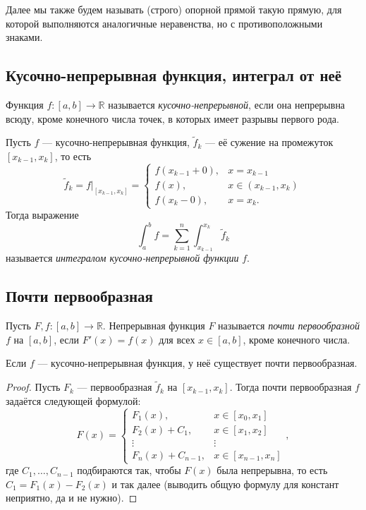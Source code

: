 \begin{remark}
	Далее мы также будем называть (строго) опорной прямой такую прямую, для которой выполняются аналогичные неравенства, но с противоположными знаками.
\end{remark}

\subsection{Кусочно-непрерывная функция, интеграл от неё}

\begin{ndefinition}
	Функция \(f \colon [a, b] \to \mathbb{R}\) называется \textit{кусочно-непрерывной}, если она непрерывна всюду, кроме конечного числа точек, в которых имеет разрывы первого рода.
\end{ndefinition}

\begin{ndefinition}
	Пусть \(f\) --- кусочно-непрерывная функция, \(\widetilde{f}_k\) --- её сужение на промежуток \([x_{k - 1}, x_k]\), то есть \[
	\widetilde{f}_k = f \big|_{[x_{k - 1}, x_k]} =
	\begin{cases}
		f(x_{k - 1} + 0), & x = x_{k - 1} 		   \\
		f(x),			  & x \in (x_{k - 1}, x_k) \\
		f(x_k - 0),		  & x = x_k.
	\end{cases}
	\]
	Тогда выражение \[
	\int_a^b f = \sum_{k = 1}^n \int_{x_{k - 1}}^{x_k} \widetilde{f}_k
	\]
	называется \textit{интегралом кусочно-непрерывной функции} \(f\).
\end{ndefinition}

\subsection{Почти первообразная}

\begin{definition}
	Пусть \(F, f \colon [a, b] \to \mathbb{R}\). Непрерывная функция \(F\) называется \textit{почти первообразной} \(f\) на \([a, b]\), если \(F'(x) = f(x)\) для всех \(x \in [a, b]\), кроме конечного числа.
\end{definition}

\begin{nremark}
	Если \(f\) --- кусочно-непрерывная функция, у неё существует почти первообразная.
\end{nremark}
\begin{proof}
	Пусть \(F_k\) --- первообразная \(\widetilde{f}_k\) на \([x_{k - 1}, x_k]\). Тогда почти первообразная \(f\) задаётся следующей формулой: \[
		F(x) = \begin{cases}
			F_1(x), & x \in [x_0, x_1] \\
			F_2(x) + C_1, & x \in [x_1, x_2] \\
			\vdots & \vdots \\
			F_n(x) + C_{n-1}, & x \in [x_{n-1}, x_n]
		\end{cases},
	\]
	где \(C_1, \ldots, C_{n-1}\) подбираются так, чтобы \(F(x)\) была непрерывна, то есть \(C_1 = F_1(x) - F_2(x)\) и так далее (выводить общую формулу для констант неприятно, да и не нужно).
\end{proof}

